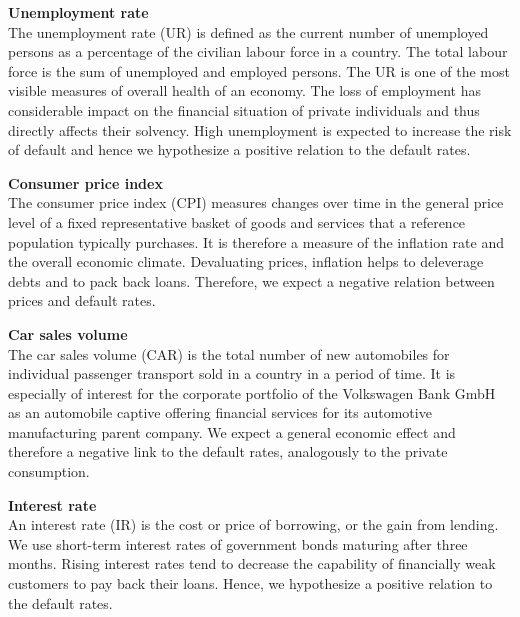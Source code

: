 \documentclass[a4paper, 12pt]{scrreprt}
\begin{document}
\bigskip

\textbf{Unemployment rate} \\
The unemployment rate (UR) is defined as the current number of unemployed persons as a percentage of the civilian labour force in a country. The total labour force is the sum of unemployed and employed persons. The UR is one of the most visible measures of overall health of an economy. The loss of employment has considerable impact on the financial situation of private individuals and thus directly affects their solvency. High unemployment is expected to increase the risk of default and hence we hypothesize a positive relation to the default rates.

\bigskip

\textbf{Consumer price index} \\
The consumer price index (CPI) measures changes over time in the general price level of a fixed representative basket of goods and services that a reference population typically purchases. It is therefore a measure of the inflation rate and the overall economic climate. 
Devaluating prices, inflation helps to deleverage debts and to pack back loans. Therefore, we expect a negative relation between prices and default rates.



\textbf{Car sales volume} \\
The car sales volume (CAR) is the total number of new automobiles for individual passenger transport sold in a country in a period of time. It is especially of interest for the corporate portfolio of the Volkswagen Bank GmbH as an automobile captive offering financial services for its automotive manufacturing parent company.
We expect a general economic effect and therefore a negative link to the default rates, analogously to the private consumption.

\bigskip 

\textbf{Interest rate} \\
An interest rate (IR) is the cost or price of borrowing, or the gain from lending. We use short-term interest rates of government bonds maturing after three months. Rising interest rates tend to decrease the capability of financially weak customers to pay back their loans. Hence, we hypothesize a positive relation to the default rates.
\end{document}

